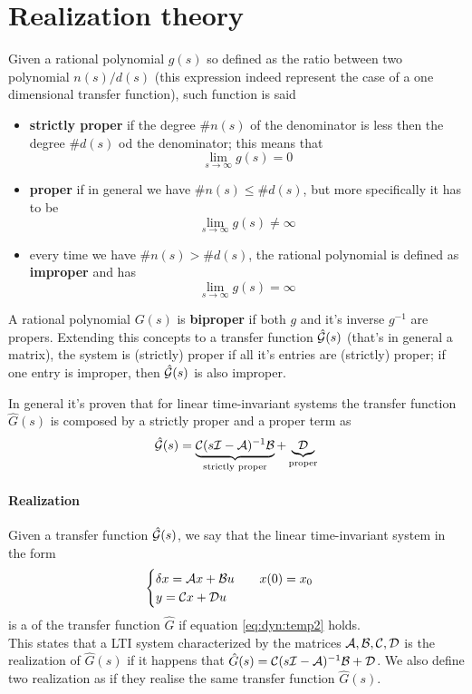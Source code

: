 \section{Realization theory}
	Given a rational polynomial $g(s)$ so defined as the ratio between two polynomial $n(s)/d(s)$ (this expression indeed represent the case of a one dimensional transfer function), such function is said
	\begin{itemize}
		\item \textbf{strictly proper} if the degree $\#n(s)$ of the denominator is less then the degree $\#d(s)$ od the denominator; this means that
		\[ \lim_{s\rightarrow \infty} g(s) = 0 \]
		\item \textbf{proper} if in general we have $\#n(s) \leq \#d(s)$, but more specifically it has to be
		\[ \lim_{s\rightarrow \infty} g(s) \neq \infty \]
		\item every time we have $\#n(s) > \#d(s)$, the rational polynomial is defined as \textbf{improper} and has
		\[ \lim_{s\rightarrow \infty} g(s) = \infty \]
	\end{itemize}	
	A rational polynomial $G(s)$ is \textbf{biproper} if both $g$ and it's inverse $g^{-1}$ are propers. Extending this concepts to a transfer function $\hat {\mathcal{G}}(s)$ (that's in general a matrix), the system is (strictly) proper if all it's entries are (strictly) proper; if one entry is improper, then $\hat {\mathcal{G}}(s)$ is also improper.
	
	In general it's proven that for linear time-invariant systems the transfer function $\hat G(s)$ is composed by a strictly proper and a proper term as
	\begin{equation} \label{eq:dyn:temp2}
		\hat {\mathcal{G}}(s) = \underbrace{\mathcal{C}(s\mathcal{I} - \mathcal{A})^{-1}\mathcal{B}}_\textrm{strictly proper} + \underbrace{\mathcal{D}}_\textrm{proper}
	\end{equation}
		
	\paragraph{Realization} Given a transfer function $\hat {\mathcal{G}}(s)$, we say that the linear time-invariant system in the form
	\[ \begin{cases}
		\delta x = \mathcal{A} x + \mathcal{B} u \qquad x(0) = x_0\\ y = \mathcal{C} x + \mathcal{D} u 
	\end{cases} \] 
	is a  of the transfer function $\hat G$ if equation \ref{eq:dyn:temp2} holds. \\
	This states that a LTI system characterized by the matrices $\mathcal{A},\mathcal{B},\mathcal{C},\mathcal{D}$ is the realization of $\hat G(s)$ if it happens that $\hat G(s) = \mathcal{C}(s\mathcal{I} - \mathcal{A})^{-1}\mathcal{B} + \mathcal{D}$. We also define two realization as  if they realise the same transfer function $\hat G(s)$.
		
